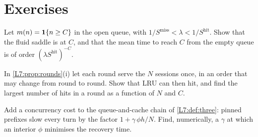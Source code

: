 \section{Exercises}

\begin{exercise}\label{L7:ex:step}
Let $m(n)=\mathbf{1}\{n\ge C\}$ in the open queue, with $1/S^{\mathrm{miss}}<\lambda<1/S^{\mathrm{hit}}$.
Show that the fluid saddle is at $C$, and that the mean time to reach $C$ from the empty
queue is of order $(\lambda S^{\mathrm{hit}})^{-C}$.
\end{exercise}

\begin{exercise}\label{L7:ex:fifo}
In \cref{L7:prop:rounds}(i) let each round serve the $N$ sessions once, in an order
that may change from round to round. Show that LRU can then hit, and find the largest
number of hits in a round as a function of $N$ and $C$.
\end{exercise}

\begin{exercise}\label{L7:ex:cost}
Add a concurrency cost to the queue-and-cache chain of \cref{L7:def:three}: pinned prefixes slow every turn by the
factor $1+\gamma\,\phi h/N$. Find, numerically, a $\gamma$ at which an interior $\phi$
minimises the recovery time.
\end{exercise}
